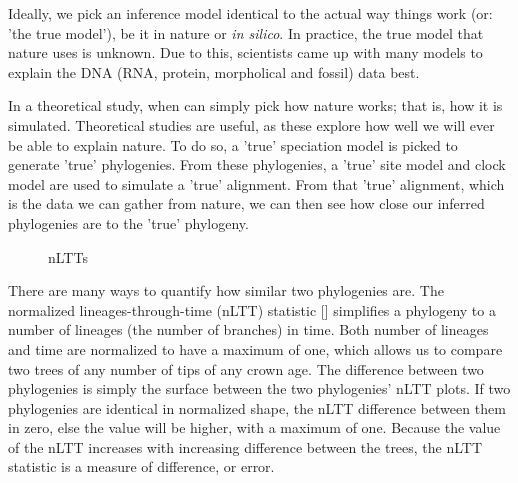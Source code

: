 Ideally, we pick an inference model identical to the actual way things 
work (or: 'the true model'), be it in nature
or \textit{in silico}. In practice, the true model that nature uses is unknown.
Due to this, scientists came up with many models to explain the 
DNA (RNA, protein, morpholical and fossil) data best.

In a theoretical study, when can simply pick how nature works; that is,
how it is simulated. Theoretical studies are useful, as these explore
how well we will ever be able to explain nature. To do so, a 'true' 
speciation model is picked to generate 'true' phylogenies. 
From these phylogenies, a 'true' site model and clock model are used to
simulate a 'true' alignment. From that 'true' alignment, which is the
data we can gather from nature, we can then see how close our inferred
phylogenies are to the 'true' phylogeny.

\begin{figure}[H]
  \centering
  \caption{
    nLTTs
  }
  \label{fig:nltts}
\end{figure}

There are many ways to quantify how similar two phylogenies are. 
The normalized lineages-through-time (nLTT) statistic [\cite{janzen2015approximate}] simplifies
a phylogeny to a number of lineages (the number of branches) in time.
Both number of lineages and time are normalized to have a maximum of one,
which allows us to compare two trees of any number of tips of any crown age.
The difference between two phylogenies is simply the surface between the
two phylogenies' nLTT plots. If two phylogenies are identical in 
normalized shape, the nLTT difference between them in zero, else the
value will be higher, with a maximum of one. Because the value of the 
nLTT increases with increasing difference between the trees, the nLTT statistic
is a measure of difference, or error. 

